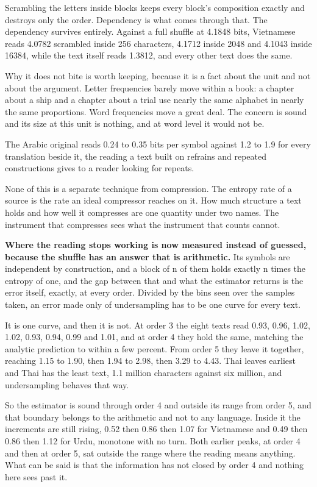 Scrambling the letters inside blocks keeps every block's composition exactly and destroys only the order. Dependency is what comes through that. The dependency survives entirely. Against a full shuffle at 4.1848 bits, Vietnamese reads 4.0782 scrambled inside 256 characters, 4.1712 inside 2048 and 4.1043 inside 16384, while the text itself reads 1.3812, and every other text does the same.

Why it does not bite is worth keeping, because it is a fact about the unit and not about the argument. Letter frequencies barely move within a book: a chapter about a ship and a chapter about a trial use nearly the same alphabet in nearly the same proportions. Word frequencies move a great deal. The concern is sound and its size at this unit is nothing, and at word level it would not be.

The Arabic original reads 0.24 to 0.35 bits per symbol against 1.2 to 1.9 for every translation beside it, the reading a text built on refrains and repeated constructions gives to a reader looking for repeats.

None of this is a separate technique from compression. The entropy rate of a source is the rate an ideal compressor reaches on it. How much structure a text holds and how well it compresses are one quantity under two names. The instrument that compresses sees what the instrument that counts cannot.

\textbf{Where the reading stops working is now measured instead of guessed, because the shuffle has an answer that is arithmetic.} Its symbols are independent by construction, and a block of n of them holds exactly n times the entropy of one, and the gap between that and what the estimator returns is the error itself, exactly, at every order. Divided by the bins seen over the samples taken, an error made only of undersampling has to be one curve for every text.

It is one curve, and then it is not. At order 3 the eight texts read 0.93, 0.96, 1.02, 1.02, 0.93, 0.94, 0.99 and 1.01, and at order 4 they hold the same, matching the analytic prediction to within a few percent. From order 5 they leave it together, reaching 1.15 to 1.90, then 1.94 to 2.98, then 3.29 to 4.43. Thai leaves earliest and Thai has the least text, 1.1 million characters against six million, and undersampling behaves that way.

So the estimator is sound through order 4 and outside its range from order 5, and that boundary belongs to the arithmetic and not to any language. Inside it the increments are still rising, 0.52 then 0.86 then 1.07 for Vietnamese and 0.49 then 0.86 then 1.12 for Urdu, monotone with no turn. Both earlier peaks, at order 4 and then at order 5, sat outside the range where the reading means anything. What can be said is that the information has not closed by order 4 and nothing here sees past it.

